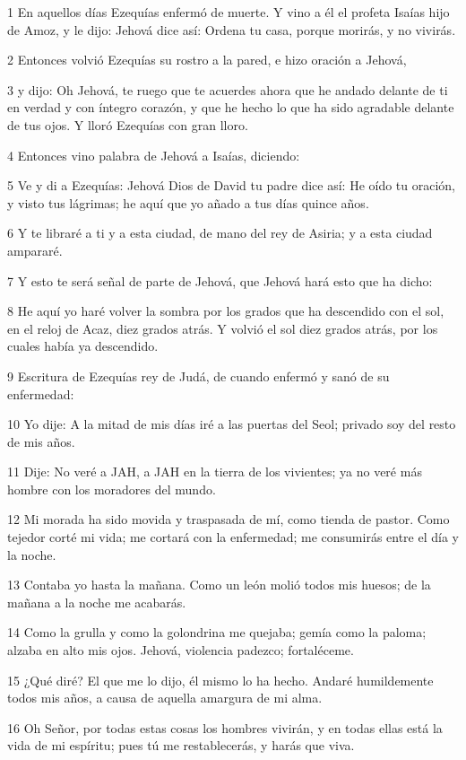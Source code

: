 \par 1 En aquellos días Ezequías enfermó de muerte. Y vino a él el profeta Isaías hijo de Amoz, y le dijo: Jehová dice así: Ordena tu casa, porque morirás, y no vivirás.
\par 2 Entonces volvió Ezequías su rostro a la pared, e hizo oración a Jehová,
\par 3 y dijo: Oh Jehová, te ruego que te acuerdes ahora que he andado delante de ti en verdad y con íntegro corazón, y que he hecho lo que ha sido agradable delante de tus ojos. Y lloró Ezequías con gran lloro.
\par 4 Entonces vino palabra de Jehová a Isaías, diciendo:
\par 5 Ve y di a Ezequías: Jehová Dios de David tu padre dice así: He oído tu oración, y visto tus lágrimas; he aquí que yo añado a tus días quince años.
\par 6 Y te libraré a ti y a esta ciudad, de mano del rey de Asiria; y a esta ciudad ampararé.
\par 7 Y esto te será señal de parte de Jehová, que Jehová hará esto que ha dicho:
\par 8 He aquí yo haré volver la sombra por los grados que ha descendido con el sol, en el reloj de Acaz, diez grados atrás. Y volvió el sol diez grados atrás, por los cuales había ya descendido.
\par 9 Escritura de Ezequías rey de Judá, de cuando enfermó y sanó de su enfermedad:
\par 10 Yo dije: A la mitad de mis días iré a las puertas del Seol; privado soy del resto de mis años.
\par 11 Dije: No veré a JAH, a JAH en la tierra de los vivientes; ya no veré más hombre con los moradores del mundo.
\par 12 Mi morada ha sido movida y traspasada de mí, como tienda de pastor. Como tejedor corté mi vida; me cortará con la enfermedad; me consumirás entre el día y la noche.
\par 13 Contaba yo hasta la mañana. Como un león molió todos mis huesos; de la mañana a la noche me acabarás.
\par 14 Como la grulla y como la golondrina me quejaba; gemía como la paloma; alzaba en alto mis ojos. Jehová, violencia padezco; fortaléceme.
\par 15 ¿Qué diré? El que me lo dijo, él mismo lo ha hecho. Andaré humildemente todos mis años, a causa de aquella amargura de mi alma.
\par 16 Oh Señor, por todas estas cosas los hombres vivirán, y en todas ellas está la vida de mi espíritu; pues tú me restablecerás, y harás que viva.
